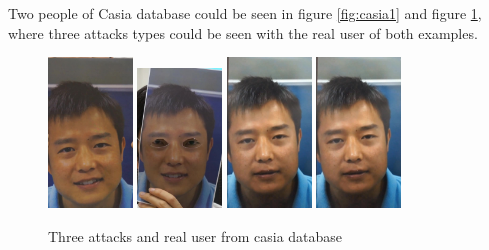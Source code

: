 Two people of Casia database could be seen in figure \ref{fig:casia1} and figure \ref{fig:casia2}, where three attacks types could be seen with the real user of both examples.

\begin{figure}[htb]
\centering
\includegraphics[width=0.2\textwidth]{images_databases/casia/at1-2.jpg}
\includegraphics[width=0.2\textwidth]{images_databases/casia/at2-2.jpg}
\includegraphics[width=0.2\textwidth]{images_databases/casia/at3-2.jpg}
\includegraphics[width=0.2\textwidth]{images_databases/casia/real2.jpg}

\caption{Three attacks and real user from casia database } \label{fig:casia2}
\end{figure}

